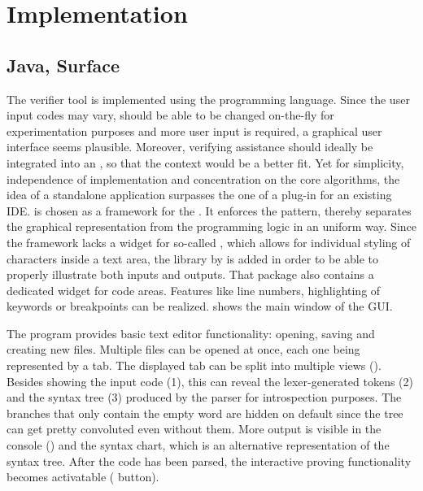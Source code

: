\chapter{Implementation}
\label{ch:Implementation}

\section{Java, Surface}
The verifier tool is implemented using the  programming language. Since the user input codes may vary, should be able to be changed on-the-fly for experimentation purposes and more user input is required, a graphical user interface seems plausible. Moreover, verifying assistance should ideally be integrated into an , so that the context would be a better fit. Yet for simplicity, independence of implementation and concentration on the core algorithms, the idea of a standalone application surpasses the one of a plug-in for an existing IDE.  is chosen as a framework for the . It enforces the  pattern, thereby separates the graphical representation from the programming logic in an uniform way. Since the framework lacks a widget for so-called , which allows for individual styling of characters inside a text area, the  library by  is added in order to be able to properly illustrate both inputs and outputs. That package also contains a dedicated widget for code areas. Features like line numbers, highlighting of keywords or breakpoints can be realized.  shows the main window of the GUI.

The program provides basic text editor functionality: opening, saving and creating new files. Multiple files can be opened at once, each one being represented by a tab. The displayed tab can be split into multiple views (). Besides showing the input code (1), this can reveal the lexer-generated tokens (2) and the syntax tree (3) produced by the parser for introspection purposes. The branches that only contain the empty word are hidden on default since the tree can get pretty convoluted even without them. More output is visible in the console () and the syntax chart, which is an alternative representation of the syntax tree. After the code has been parsed, the interactive proving functionality becomes activatable ( button).

